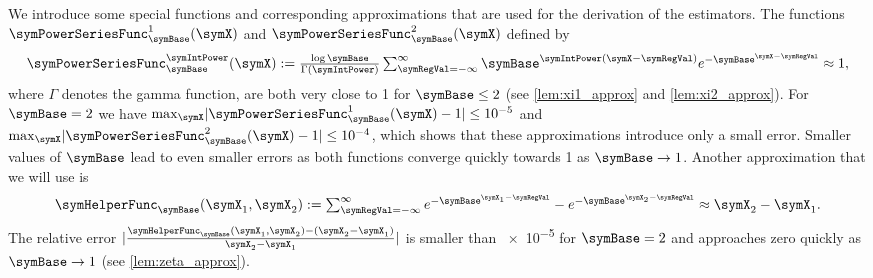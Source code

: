 \documentclass[sigconf, nonacm]{acmart}
\newif\ifextended\extendedtrue
\begin{document}
We introduce some special functions and corresponding approximations that are used for the derivation of the estimators. The functions $\symPowerSeriesFunc_\symBase^1(\symX)$ and $\symPowerSeriesFunc_\symBase^2(\symX)$ defined by
\begin{equation}
\label{equ:approx_xi}
  \symPowerSeriesFunc_\symBase^\symIntPower(\symX):= 
{\textstyle
\frac{\log \symBase}{\Gamma(\symIntPower)} \sum_{\symRegVal = -\infty}^\infty
  \symBase^{\symIntPower (\symX-\symRegVal)}
  e^{-\symBase^{\symX-\symRegVal}}}
\approx 1,
\end{equation}
where $\Gamma$ denotes the gamma function, are both very close to 1 for $\symBase\leq 2$ \ifextended(see \cref{lem:xi1_approx} and \cref{lem:xi2_approx})\else\cite{Ertl2021}\fi. For $\symBase=2$ we have $\max_\symX \mathopen|\symPowerSeriesFunc_\symBase^1(\symX) - 1\mathclose|\leq \num{e-5}$ and $\max_\symX \mathopen|\symPowerSeriesFunc_\symBase^2(\symX) - 1\mathclose|\leq \num{e-4}$, which shows that these approximations introduce only a small error. Smaller values of $\symBase$ lead to even smaller errors as both functions converge quickly towards 1 as $\symBase\rightarrow 1$.
Another approximation that we will use is
\begin{equation}
\label{equ:approx_zeta}
\symHelperFunc_\symBase(\symX_1,\symX_2):={\textstyle\sum_{\symRegVal=-\infty}^\infty e^{-\symBase^{\symX_1-\symRegVal}} - e^{-\symBase^{\symX_2-\symRegVal}}}
\approx
\symX_2-\symX_1
.
\end{equation}
The relative error $|\frac{\symHelperFunc_\symBase(\symX_1,\symX_2) - (\symX_2 - \symX_1)}{\symX_2 - \symX_1}|$ is smaller than \num{e-5} for $\symBase=2$ and approaches zero quickly as $\symBase\rightarrow 1$ \ifextended(see \cref{lem:zeta_approx})\else\cite{Ertl2021}\fi.
\end{document}
